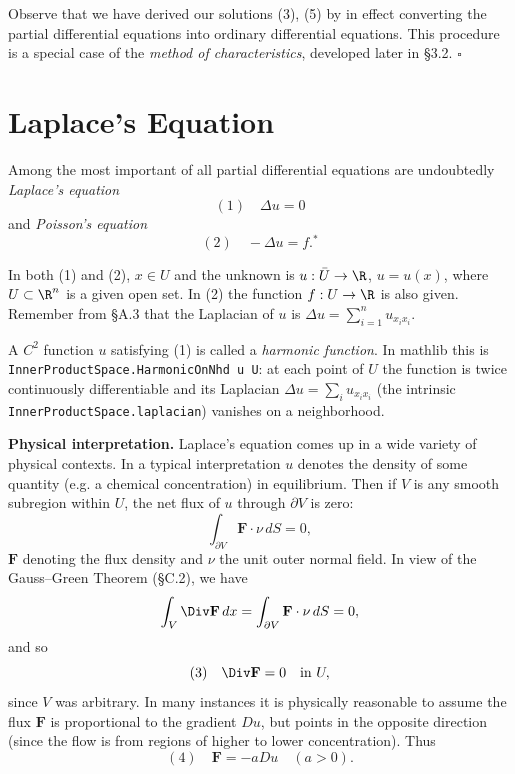 \begin{remark}
\label{rem:transport-equation-method-of-characteristics}
Observe that we have derived our solutions (3), (5) by in effect converting the partial differential equations into ordinary differential equations. This procedure is a special case of the \textit{method of characteristics}, developed later in \S3.2. $\square$
\end{remark}

\section{Laplace's Equation}
\label{sec:laplaces-equation}

Among the most important of all partial differential equations are undoubtedly \textit{Laplace's equation}
$$(1) \quad \Delta u = 0$$
and \textit{Poisson's equation}
$$(2) \quad -\Delta u = f.^*$$

In both (1) and (2), $x \in U$ and the unknown is $u : \bar{U} \to \R$, $u = u(x)$, where $U \subset \R^n$ is a given open set. In (2) the function $f : U \to \R$ is also given. Remember from \S A.3 that the Laplacian of $u$ is $\Delta u = \sum_{i=1}^n u_{x_i x_i}$.

\begin{definition}
\label{def:harmonic-function}
\mathlibok
A $C^2$ function $u$ satisfying (1) is called a \textit{harmonic function}. In
mathlib this is \lstinline{InnerProductSpace.HarmonicOnNhd u U}: at each point of
$U$ the function is twice continuously differentiable and its Laplacian
$\Delta u = \sum_i u_{x_i x_i}$ (the intrinsic \lstinline{InnerProductSpace.laplacian})
vanishes on a neighborhood.
\end{definition}

\textbf{Physical interpretation.} Laplace's equation comes up in a wide variety of physical contexts. In a typical interpretation $u$ denotes the density of some quantity (e.g. a chemical concentration) in equilibrium. Then if $V$ is any smooth subregion within $U$, the net flux of $u$ through $\partial V$ is zero:
$$\int_{\partial V} \mathbf{F} \cdot \nu \, dS = 0,$$
$\mathbf{F}$ denoting the flux density and $\nu$ the unit outer normal field. In view of the Gauss--Green Theorem (\S C.2), we have
$$\int_V \Div \mathbf{F} \, dx = \int_{\partial V} \mathbf{F} \cdot \nu \, dS = 0,$$
and so
$$(3) \quad \Div \mathbf{F} = 0 \quad \text{in } U,$$
since $V$ was arbitrary. In many instances it is physically reasonable to assume the flux $\mathbf{F}$ is proportional to the gradient $Du$, but points in the opposite direction (since the flow is from regions of higher to lower concentration). Thus
$$(4) \quad \mathbf{F} = -a Du \quad (a > 0).$$

